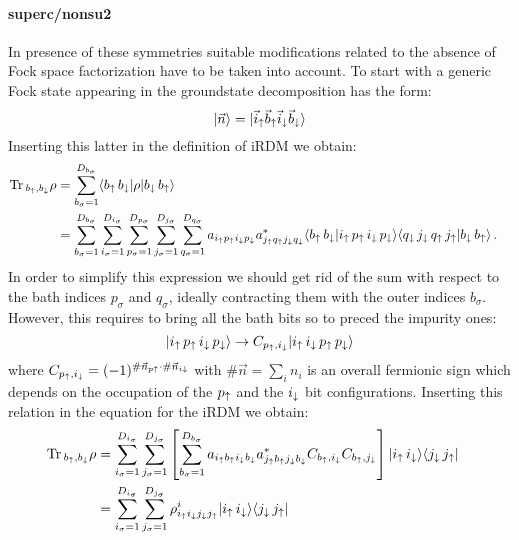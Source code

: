 \documentclass[edipack2.tex]{subfiles}
\begin{document}
\paragraph{{\bf superc/nonsu2}}
In presence of these symmetries suitable modifications related to the
absence of Fock space factorization have to be taken into account. To
start with a generic Fock state appearing in the groundstate
decomposition has the form:
$$
\ket{\vec{n}} =\ket{\vec{i}_\up\vec{b}_\up\vec{i}_\dw\vec{b}_\dw}
%
$$
Inserting this latter in the definition of iRDM we obtain:
\begin{equation}
  \begin{aligned}
    \Tr_{b_\up, b_\dw}{\rho} &=
    \sum_{b_\sigma=1}^{D_{b_\sigma}}
    \bra{b_\up\, b_\dw}
    \rho
    \ket{b_\dw\, b_\up}    \cr
    &=
    \sum_{b_\sigma=1}^{D_{b_\sigma}}
    \sum_{i_\sigma=1}^{D_{i_\sigma}}
    \sum_{p_\sigma=1}^{D_{p_\sigma}}
    \sum_{j_\sigma=1}^{D_{j_\sigma}} 
    \sum_{q_\sigma=1}^{D_{q_\sigma}}
    a_{i_\up p_\up i_\dw p_\dw} a^*_{j_\up q_\up j_\dw q_\dw}%
    \langle{b_\up\, b_\dw}|{i_\up\, p_\up\, i_\dw\, p_\dw}\rangle
    \langle{q_\dw \,  j_\dw \, q_\up\, j_\up }|{b_\dw\, b_\up}\rangle\, .
  \end{aligned}
\end{equation}
In order to simplify this expression we should get rid of the sum with
respect to the bath indices $p_\sigma$ and $q_\sigma$, ideally
contracting them with the outer indices $b_\sigma$.
However, this requires to bring all the bath bits so to preced the
impurity ones:
$$
|i_\uparrow\, p_\uparrow\, i_\downarrow\, p_\downarrow\rangle \rightarrow C_{p_\uparrow,i_\downarrow} |i_\uparrow\, i_\downarrow \,p_\uparrow\,p_\downarrow\rangle
$$
where $C_{p_\uparrow,i_\downarrow}  = (-1)^{\#\vec{n}_{p\uparrow} \cdot
  \#\vec{n}_{i\downarrow}}$ with   $\#\vec{n}=\sum_i n_i$ is an overall
fermionic sign which depends on the occupation of the $p_\uparrow$ and the
$i_\downarrow$ bit configurations. Inserting this relation in the equation
for the iRDM we obtain:
\begin{equation}
  \begin{aligned}
    {\rm Tr}\,_{b_\uparrow, b_\downarrow}{\rho} &=
    \sum_{i_\sigma=1}^{D_{i_\sigma}}
    \sum_{j_\sigma=1}^{D_{j_\sigma}}
    \left[\sum_{b_\sigma=1}^{D_{b_\sigma}}
    a_{i_\uparrow b_\uparrow i_\downarrow b_\downarrow} a^*_{j_\uparrow b_\uparrow j_\downarrow b_\downarrow}
    C_{b_\uparrow,i_\downarrow}C_{b_\uparrow,j_\downarrow}\right]
    |i_\uparrow\, i_\downarrow\rangle\langle j_\downarrow \, j_\uparrow|\cr
&=
    \sum_{i_\sigma=1}^{D_{i_\sigma}}
    \sum_{j_\sigma=1}^{D_{j_\sigma}}
    \rho^{i}_{i_\uparrow i_\downarrow j_\downarrow j_\uparrow}
    |i_\uparrow\, i_\downarrow\rangle\langle j_\downarrow \, j_\uparrow| 
  \end{aligned}
\end{equation}
\end{document}
